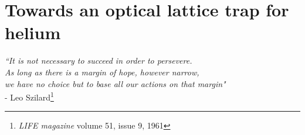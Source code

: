 
\chapter{Towards an optical lattice trap for helium}
\label{chap:lattice}


	\begin{flushright}
	\singlespacing
	\emph{``It is not necessary to succeed in order to persevere.\\
	As long as there is a margin of hope, however narrow, \\
	we have no choice but to base all our actions on that margin"}\\
	- Leo Szilard\footnote{\emph{LIFE magazine} volume 51, issue 9, 1961 }\\
	\end{flushright}
	\onehalfspacing


	


